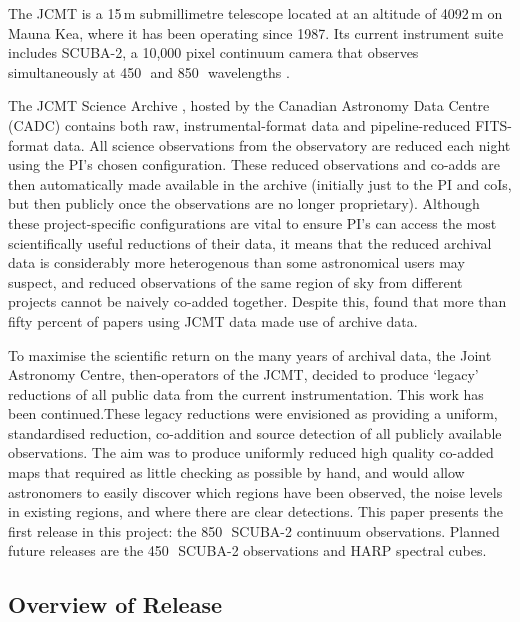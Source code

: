 \documentclass[twocolumn]{aastex6}
\newcommand{\um}{\micron}
\begin{document}
The JCMT is a 15\,m submillimetre telescope located at an altitude of
4092\,m on Mauna Kea, where it has been operating since
1987. Its current instrument suite includes SCUBA-2, a 10,000
pixel continuum camera that observes simultaneously at 450\,\um\ and
850\,\um\ wavelengths \citep{Holland2013}.

The JCMT Science Archive \citep{2015Economou}, hosted by the Canadian
Astronomy Data Centre (CADC) contains both raw, instrumental-format
data and pipeline-reduced FITS-format data. All science observations
from the observatory are reduced each night using the PI's chosen
configuration.  These reduced observations and co-adds are then
automatically made available in the archive (initially just to the PI
and coIs, but then publicly once the observations are no longer
proprietary). Although these project-specific configurations are vital
to ensure PI's can access the most scientifically useful reductions of
their data, it means that the reduced archival data is considerably
more heterogenous than some astronomical users may suspect, and
reduced observations of the same region of sky from different projects
cannot be naively co-added together. Despite this, \citet{Bell2014}
found that more than fifty percent of papers using JCMT data made use
of archive data.

To maximise the scientific return on the many years of archival data,
the Joint Astronomy Centre, then-operators of the JCMT, decided to
produce `legacy' reductions of all public data from the current
instrumentation. This work has been continued.These legacy reductions were envisioned as providing
a uniform, standardised reduction, co-addition and source detection of
all publicly available observations. The aim was to produce uniformly
reduced high quality co-added maps that required as little checking as
possible by hand, and would allow astronomers to easily discover which
regions have been observed, the noise levels in existing regions, and
where there are clear detections. This paper presents the first
release in this project: the 850\,\um\ SCUBA-2 continuum
observations. Planned future releases are the 450\,\um\ SCUBA-2
observations and HARP spectral cubes.






\subsection{Overview of Release}
\end{document}
